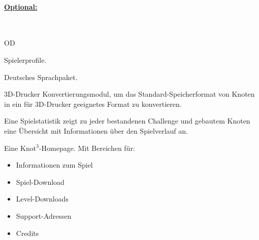 %
%
\paragraph*{\underline{Optional:}}~\\


\begin{ids}{\gls{OD}}

	\id[200] Spielerprofile.
	
	\id[210] Deutsches Sprachpaket.
	
	\id[220] 3D-Drucker Konvertierungsmodul, um das Standard-Speicherformat von Knoten in ein für 3D-Drucker geeignetes Format zu konvertieren.
	
	\id[230] Eine Spielstatistik zeigt zu jeder bestandenen Challenge und gebautem Knoten eine Übersicht mit Informationen über den Spielverlauf an.
	
	\id[250] Eine Knot$^3$-Homepage. Mit Bereichen für:
	
	\begin{itemize}
		
		\item Informationen zum Spiel
		\item Spiel-Download
		\item Level-Downloads
		\item Support-Adressen
		\item Credits
	
	\end{itemize}
	
\end{ids}


